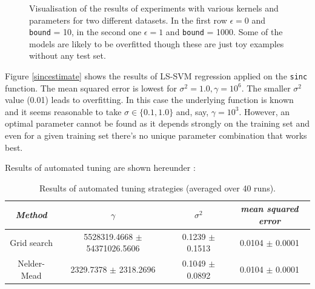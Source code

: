 \begin{figure}[h]
\qquad
{}\qquad
\caption{Visualisation of the results of experiments with various kernels and parameters for two different datasets. In the first row $\epsilon=0$ and \texttt{bound} = 10, in the second one $\epsilon=1$ and \texttt{bound} = 1000. Some of the models are likely to be overfitted though these are just toy examples without any test set.}
\label{functionestimation}
\end{figure}


Figure \ref{sincestimate} shows the results of LS-SVM regression applied on the \texttt{sinc} function. The mean squared error is lowest for $\sigma^2=1.0,\gamma=10^6$. The smaller $\sigma^2$ value (0.01) leads to overfitting. In this case the underlying function is known and it seems reasonable to take $\sigma\in\{0.1,1.0\}$ and, say, $\gamma=10^3$. However, an optimal parameter cannot be found as it depends strongly on the training set and even for a given training set there's no unique parameter combination that works best.

\par Results of automated tuning are shown hereunder :

\begin{table}[h]
\centering
\begin{tabular}{c|ccc}
\textit{Method} & $\gamma$ & $\sigma^2$ & \textit{mean squared error} \\
\hline
Grid search & 5528319.4668 $\pm$ 54371026.5606 & 0.1239 $\pm$  0.1513 & 0.0104 $\pm$ 0.0001\\
Nelder-Mead & 2329.7378 $\pm$ 2318.2696 & 0.1049 $\pm$ 0.0892 &  0.0104 $\pm$ 0.0001\\
\end{tabular}
\caption{Results of automated tuning strategies (averaged over 40 runs).}
\label{automatedtuning}
\end{table}

